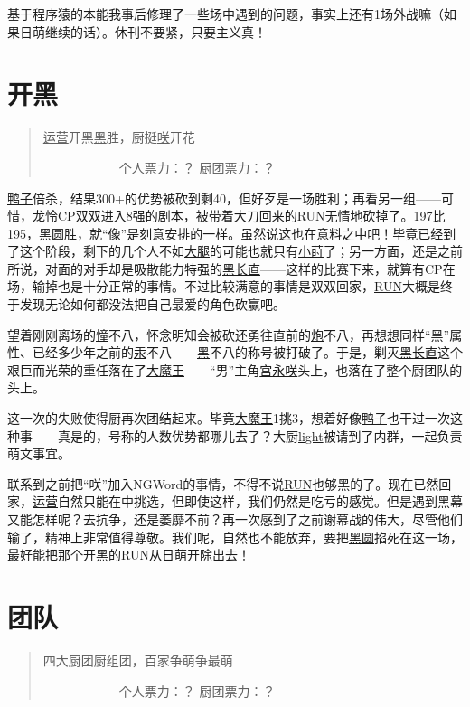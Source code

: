 基于程序猿的本能我事后修理了一些场中遇到的问题，事实上还有1场外战嘛（如果日萌继续的话）。休刊不要紧，只要主义真！

\chapter{开黑}
\begin{quote}
\uline{运营}开黑\uline{黑}胜，厨挺\uline{咲}开花

　　　　　　个人票力：？ 厨团票力：？
\end{quote}

\uline{鸭子}倍杀，结果300+的优势被砍到剩40，但好歹是一场胜利；再看另一组——可惜，\uline{龙}\uline{怜}CP双双进入8强的剧本，被带着大刀回来的\uline{RUN}无情地砍掉了。197比195，\uline{黑圆}胜，就“像”是刻意安排的一样。虽然说这也在意料之中吧！毕竟已经到了这个阶段，剩下的几个人不如\uline{大腿}的可能也就只有\uline{小莳}了；另一方面，还是之前所说，对面的对手却是吸散能力特强的\uline{黑长直}——这样的比赛下来，就算有CP在场，输掉也是十分正常的事情。不过比较满意的事情是双双回家，\uline{RUN}大概是终于发现无论如何都没法把自己最爱的角色砍赢吧。

望着刚刚离场的\uline{憧}不八，怀念明知会被砍还勇往直前的\uline{炮}不八，再想想同样“黑”属性、已经多少年之前的\uline{汞}不八——\uline{黑}不八的称号被打破了。于是，剿灭\uline{黑长直}这个艰巨而光荣的重任落在了\uline{大魔王}——“男”主角\uline{宫永咲}头上，也落在了整个厨团队的头上。

这一次的失败使得厨再次团结起来。毕竟\uline{大魔王}1挑3，想着好像\uline{鸭子}也干过一次这种事——真是的，号称的人数优势都哪儿去了？大厨\uline{light}被请到了内群，一起负责萌文事宜。

联系到之前把“咲”加入NGWord的事情，不得不说\uline{RUN}也够黑的了。现在已然回家，\uline{运营}自然只能在中挑选，但即使这样，我们仍然是吃亏的感觉。但是遇到黑幕又能怎样呢？去抗争，还是萎靡不前？再一次感到了之前谢幕战的伟大，尽管他们输了，精神上非常值得尊敬。我们呢，自然也不能放弃，要把\uline{黑圆}掐死在这一场，最好能把那个开黑的\uline{RUN}从日萌开除出去！

\chapter{团队}
\begin{quote}
四大厨团厨组团，百家争萌争最萌

　　　　　　个人票力：？ 厨团票力：？
\end{quote}

